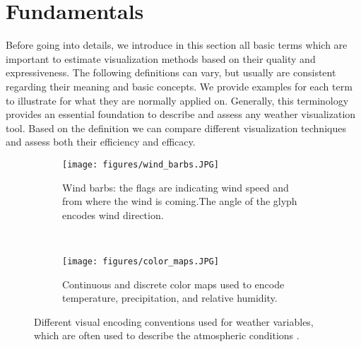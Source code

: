 \documentclass[citeauthoryear]{llncs}
\begin{document}
%
\section{Fundamentals}
Before going into details, we introduce in this section all basic terms which are important to estimate visualization methods based on their quality and expressiveness. The following definitions can vary, but usually are consistent regarding their meaning and basic concepts. We provide examples for each term to illustrate for what they are normally applied on. Generally, this terminology provides an essential foundation to describe and assess any weather visualization tool. Based on the definition we can compare different visualization techniques and assess both their efficiency and efficacy. 
\begin{figure}[h]
	\centering
	\begin{subfigure}[t]{0.4\textwidth}
		\centering
		\texttt{[image: figures/wind\_barbs.JPG]} 
		\caption{Wind barbs: the flags are indicating wind speed and from where the wind is coming.The angle of the glyph encodes wind direction.}
		\label{barbs}
	\end{subfigure}%
	~ ~ ~ ~
	\begin{subfigure}[t]{0.55\textwidth}
		\centering
		\texttt{[image: figures/color\_maps.JPG]} 
		\caption{Continuous and discrete color maps used to encode temperature, precipitation, and relative humidity.}
		\label{colormaps}
	\end{subfigure}
	\caption{Different visual encoding conventions used for weather variables, which are often used to describe the atmospheric conditions \cite{quinan2016visually}.}
\end{figure}
\end{document}
